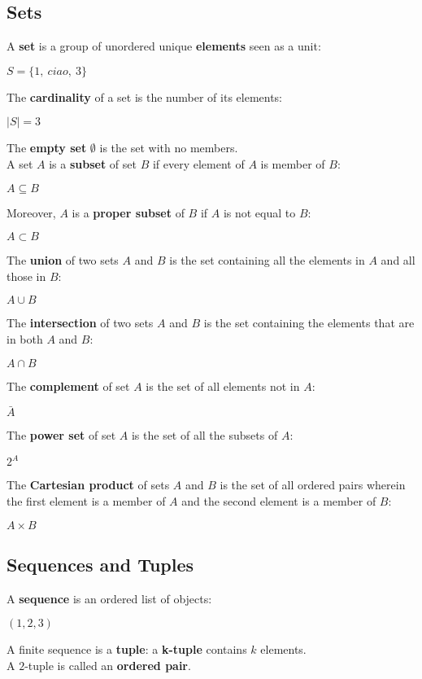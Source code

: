 \documentclass{article}
\begin{document}
\subsection{Sets}
A \textbf{set} is a group of unordered unique \textbf{elements} seen as a unit:
\begin{center}
    $S = \{1, \ ciao, \ 3\}$
\end{center}
The \textbf{cardinality} of a set is the number of its elements:
\begin{center}
    $|S| = 3$
\end{center}
The \textbf{empty set} $\emptyset$ is the set with no members. \\
A set $A$ is a \textbf{subset} of set $B$ if every element of $A$ is member of $B$:
\begin{center}
    $A \subseteq B$
\end{center}
Moreover, $A$ is a \textbf{proper subset} of $B$ if $A$ is not equal to $B$:
\begin{center}
    $A \subset B$
\end{center}
The \textbf{union} of two sets $A$ and $B$ is the set containing all the elements in $A$ and all those in $B$:
\begin{center}
    $A \cup B$
\end{center}
The \textbf{intersection} of two sets $A$ and $B$ is the set containing the elements that are in both $A$ and $B$:
\begin{center}
    $A \cap B$
\end{center}
\noindent
The \textbf{complement} of set $A$ is the set of all elements not in $A$:
\begin{center}
    $\bar{A}$
\end{center}
The \textbf{power set} of set $A$ is the set of all the subsets of $A$:
\begin{center}
    $2^A$
\end{center}
The \textbf{Cartesian product} of sets $A$ and $B$ is the set of all ordered pairs wherein the first element is a member of $A$ and the second element is a member of $B$:
\begin{center}
    $A \times B$
\end{center}
\subsection{Sequences and Tuples}
A \textbf{sequence} is an ordered list of objects:
\begin{center}
    $(1, 2, 3)$
\end{center}
A finite sequence is a \textbf{tuple}: a \textbf{k-tuple} contains $k$ elements. \\
A $2$-tuple is called an \textbf{ordered pair}.
\end{document}
